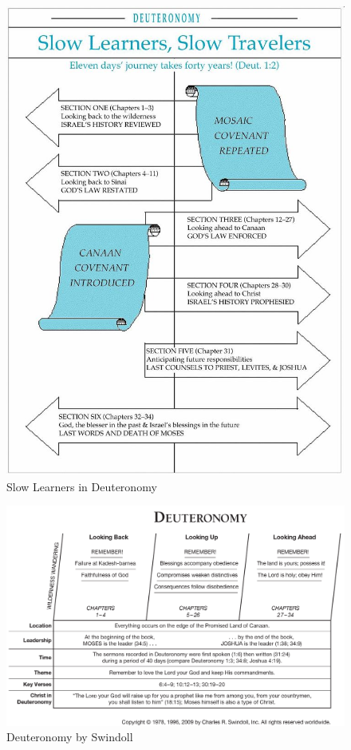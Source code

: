 \newpage
\begin{figure}
\begin{center}
\includegraphics[scale=0.5, angle=0]{05OT-Deuteronomy/References/SlowLearners.jpeg}
\caption[Slow Learners in Deuteronomy]{Slow Learners in Deuteronomy}
\label{fig:Slow Learners in Deuteronomy}
\end{center}
\end{figure}


\newpage
\begin{figure}
\begin{center}
\includegraphics[scale=0.3, angle=90]{05OT-Deuteronomy/References/Swindoll-Deuteronomy.png}
\caption[Deuteronomy by Swindoll]{Deuteronomy by Swindoll}
\label{fig:Deuteronomy by Swindoll}
\end{center}
\end{figure}


